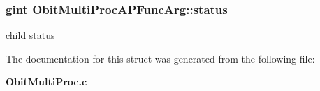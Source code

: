 \subsubsection{\setlength{\rightskip}{0pt plus 5cm}gint {\bf Obit\-Multi\-Proc\-APFunc\-Arg::status}}\label{structObitMultiProcAPFuncArg_o1}


child status 



The documentation for this struct was generated from the following file:\begin{CompactItemize}
\item 
{\bf Obit\-Multi\-Proc.c}\end{CompactItemize}
